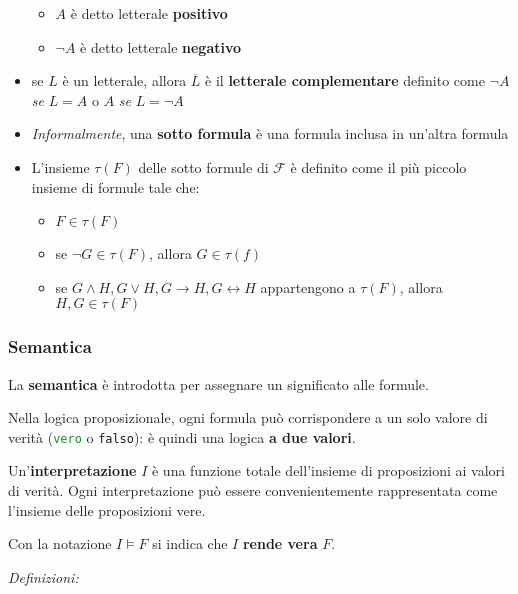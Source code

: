 \documentclass[italian, 10pt]{article}
\newcommand{\vero}{\textcolor{ForestGreen}{\texttt{vero}}\xspace} %
\newcommand{\falso}{\textcolor{BrickRed}{\texttt{falso}}\xspace} %
\begin{document}
\begin{itemize}
        \begin{itemize}
          \item \(A\) è detto letterale \textbf{positivo}
          \item \(\lnot A\) è detto letterale \textbf{negativo}
        \end{itemize}
  \item se \(L\) è un letterale, allora \(\overline{L}\) è il \textbf{letterale complementare} definito come \(\lnot A\) \textit{se} \(L = A\) o \(A\) \textit{se} \(L = \lnot A\)
  \item \textit{Informalmente}, una \textbf{sotto formula} è una formula inclusa in un'altra formula
  \item L'insieme \(\tau(F)\) delle sotto formule di \(\mathcal{F}\) è definito come il più piccolo insieme di formule tale che:
        \begin{itemize}
          \item \(F \in \tau(F)\)
          \item se \(\lnot G \in \tau(F)\), allora \(G \in \tau(f)\)
          \item se \(G \land H, G \lor H, G \rightarrow H, G \leftrightarrow H\) appartengono a \(\tau(F)\), allora \(H, G \in \tau(F)\)
        \end{itemize}
\end{itemize}

\subsubsection{Semantica}
\label{sec:semantica-PL}

La \textbf{semantica} è introdotta per assegnare un significato alle formule.

Nella logica proposizionale, ogni formula può corrispondere a un solo valore di verità (\vero o \falso): è quindi una logica \textbf{a due valori}.

Un'\textbf{interpretazione} \(I\) è una funzione totale dell'insieme di proposizioni ai valori di verità.
Ogni interpretazione può essere convenientemente rappresentata come l'insieme delle proposizioni vere.

Con la notazione \(I \vDash F\) si indica che \(I\) \textbf{rende vera} \(F\).

\bigskip

\textit{Definizioni:}
\end{document}
